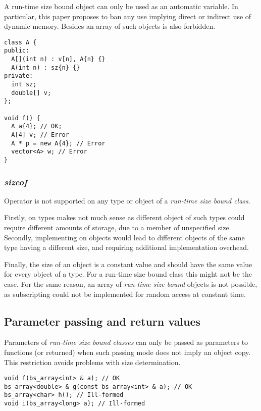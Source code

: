 A run-time size bound object can only be used as an automatic variable.
In particular, this paper proposes to ban any use implying direct or indirect
use of dynamic memory. Besides an array of such objects is also forbidden.

\begin{lstlisting}
class A {
public:
  A[](int n) : v[n], A{n} {}
  A(int n) : sz{n} {}
private:
  int sz;
  double[] v;
};

void f() {
  A a{4}; // OK;
  A[4] v; // Error
  A * p = new A{4}; // Error
  vector<A> w; // Error
}
\end{lstlisting}

\subsubsection{\emph{sizeof}}

Operator  is not supported on any type or object of a \emph{run-time size bound class}.

Firstly, on types  makes not much sense as different object of such types could require
different amounts of storage, due to a member of unspecified size. Secondly, implementing 
on objects would lead to different objects of the same type having a different size, and requiring
additional implementation overhead.

Finally, the size of an object is a constant value and should have the same value for every object of
a type. For a run-time size bound class this might not be the case. For the same reason, an array of
\emph{run-time size bound} objects is not possible, as subscripting could not be implemented for
random access at constant time.

\subsection{Parameter passing and return values}

Parameters of \emph{run-time size bound classes} can only be passed as parameters to functions (or returned)
when such passing mode does not imply an object copy. This restriction avoids problems with size determination.

\begin{lstlisting}
void f(bs_array<int> & a); // OK
bs_array<double> & g(const bs_array<int> & a); // OK
bs_array<char> h(); // Ill-formed
void i(bs_array<long> a); // Ill-formed
\end{lstlisting}

